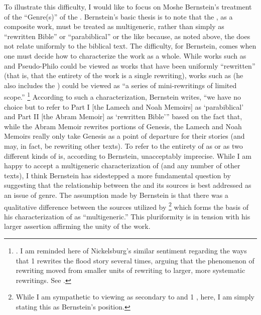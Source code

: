 To illustrate this difficulty, I would like to focus on Moshe Bernstein's treatment of the ``Genre(s)'' of the \ga.\autocite[As argued in][]{bernstein_berthelot-etal2010} Bernstein's basic thesis is to note that the \ga, as a composite work, must be treated as multigeneric, rather than simply as ``rewritten Bible'' or ``parabiblical'' or the like because, as noted above, the \ga does not relate uniformly to the biblical text. The difficulty, for Bernstein, comes when one must decide how to characterize the work as a whole. While works such as \jub and Pseudo-Philo could be viewed as works that have been uniformly ``rewritten'' (that is, that the entirety of the work is a single rewriting), works such as \ga (he also includes the \templescroll) could be viewed as ``a series of mini-rewritings of limited scope.''%
%
\footnote{\cite[336]{bernstein_berthelot-etal2010}. I am reminded here of Nickelsburg's similar sentiment regarding the ways that 1 \enoch rewrites the flood story several times, arguing that the phenomenon of rewriting moved from smaller units of rewriting to larger, more systematic rewritings. See \cite[TODO: Get Pages]{nickelsburg_stone1984}.}
%
According to such a characterization, Bernstein writes, ``we have no choice but to refer to Part I [the Lamech and Noah Memoirs] as `parabiblical' and Part II [the Abram Memoir] as `rewritten Bible''' based on the fact that, while the Abram Memoir rewrites portions of Genesis, the Lamech and Noah Memoirs really only take Genesis as a point of departure for their stories (and may, in fact, be rewriting other texts).\autocite[337]{bernstein_berthelot-etal2010} To refer to the entirety of \ga as \rwb or as two different kinds of \rwb is, according to Bernstein, unacceptably imprecise. While I am happy to accept a multigeneric characterization of \ga (and any number of other texts), I think Bernstein has sidestepped a more fundamental question by suggesting that the relationship between the \ga and its sources is best addressed as an issue of genre. The assumption made by Bernstein is that there was a qualitative difference between the sources utilized by \ga\footnote{While I am sympathetic to viewing \ga as secondary to \jub and 1 \enoch, here, I am simply stating this as Bernstein's position.} which forms the basis of his characterization of \ga as ``multigeneric.'' This pluriformity is in tension with his larger assertion affirming the unity of the work. 

